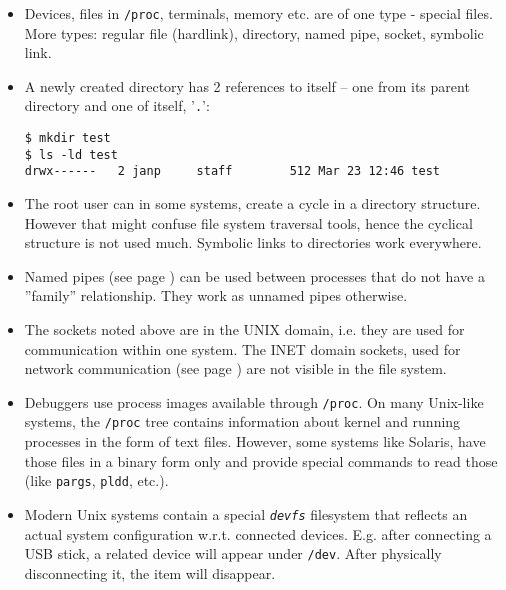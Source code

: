 \begin{itemize}
\item Devices, files in \texttt{/proc}, terminals, memory etc. are of one type
- special files. More types: regular file (hardlink), directory, named pipe,
socket, symbolic link.
\item A newly created directory has 2 references to itself -- one from its parent
directory and one of itself, '\texttt{.}':

\begin{verbatim}
$ mkdir test
$ ls -ld test
drwx------   2 janp     staff        512 Mar 23 12:46 test
\end{verbatim}

\item The root user can in some systems, create a cycle in a directory structure.
However that might confuse file system traversal tools, hence the cyclical
structure is not used much. Symbolic links to directories work everywhere.
\item Named pipes (see page \pageref{MKFIFO}) can be used between processes
that do not have a ''family'' relationship.  They work as unnamed pipes otherwise.
\item The sockets noted above are in the UNIX domain, i.e. they are used for
communication within one system. The INET domain sockets, used for network
communication (see page \pageref{NETWORKING}) are not visible in the file
system.
\item Debuggers use process images available through \texttt{/proc}.
On many Unix-like systems, the \texttt{/proc} tree contains information about
kernel and running processes in the form of text files.  However, some systems
like Solaris, have those files in a binary form only and provide special
commands to read those (like \texttt{pargs}, \texttt{pldd}, etc.).
\item Modern Unix systems contain a special \emph{\texttt{devfs}} filesystem
that reflects an actual system configuration w.r.t. connected devices. E.g.
after connecting a USB stick, a related device will appear under \texttt{/dev}.
After physically disconnecting it, the item will disappear.
\end{itemize}


\begin{slide}
\begin{center}

\end{center}
\end{slide}

